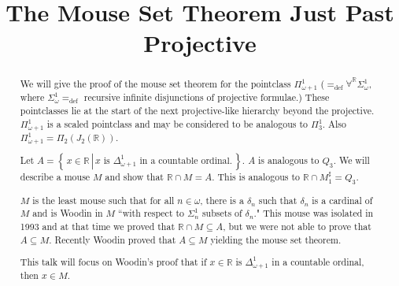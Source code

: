 \documentclass[oneside,12pt]{amsart}
\newcommand{\R}{\mathbb{R}}
\newcommand{\setof}[2]{\left\{ \, #1 \, \left| \, #2 \, \right.\right\}}
\newcommand{\intersect}{\cap}
\newcommand{\defeq}{=_{\text{def}}}
\begin{document}
\title{The Mouse Set Theorem Just Past Projective}
\begin{abstract}
We will give the proof of the mouse set theorem for the pointclass
$\Pi^1_{\omega+1}$ ($\defeq \forall^{\R} \Sigma^1_{\omega}$,
where $\Sigma^1_{\omega}\defeq$  recursive infinite disjunctions of projective formulae.)
These pointclasses lie at the start of the next projective-like hierarchy
beyond the projective. $\Pi^1_{\omega+1}$  is a scaled pointclass
and may be considered to be analogous to $\Pi^1_3$. Also $\Pi^1_{\omega+1} = \Pi_2(J_2(\R))$.

Let $A=\setof{x\in\R}{x\text{ is } \Delta^1_{\omega+1} \text{ in a countable ordinal.}}$.
$A$ is analogous to $Q_3$. We will describe a mouse $M$ and show that
$\R\intersect M = A$. This is analogous to $\R\intersect M_1^{\sharp} = Q_3$.

$M$ is the least mouse such that for all $n\in\omega$, there is a $\delta_n$ such
that $\delta_n$ is a cardinal of $M$ and is Woodin in $M$ ``with respect to
$\Sigma^1_n$ subsets of $\delta_n$." This mouse was isolated in 1993
and at that time we proved that $\R\intersect M \subseteq A$, but we were
not able to prove that $A \subseteq  M$. Recently Woodin proved
that $A \subseteq M$ yielding the mouse set theorem.

This talk will focus on Woodin's proof that if $x\in\R$ is $\Delta^1_{\omega+1}$
in a countable ordinal, then $x\in M$.


\end{abstract}

\maketitle
\end{document}
